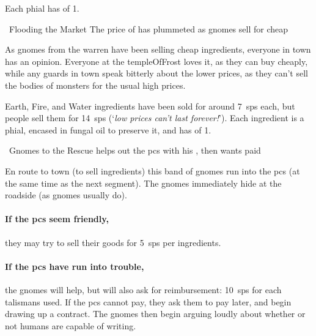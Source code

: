 Each phial has  of 1.

{\squash~Flooding the Market}%
{The price of  has plummeted as gnomes sell for cheap}%

\begin{exampletext}
  As gnomes from the \gls{warren} have been selling cheap \glspl{ingredient}, everyone in town has an opinion.
  Everyone at the \gls{templeOfFrost} loves it, as they can buy cheaply, while any \glspl{guard} in town speak bitterly about the lower prices, as they can't sell the bodies of \glspl{monster} for the usual high prices.
\end{exampletext}

Earth, Fire, and Water \glspl{ingredient} have been sold for around 7~\glspl{sp} each, but people sell them for 14~\glspl{sp} (`\textit{low prices can't last forever!}').
Each \gls{ingredient} is a phial, encased in fungal oil to preserve it, and has  of 1.

{\squash~Gnomes to the Rescue}%
{ helps out the \glspl{pc} with his , then wants paid}%

En route to town (to sell \glspl{ingredient}) this band of gnomes run into the \glspl{pc} (at the same time as the next \gls{segment}).
The gnomes immediately hide at the roadside (as gnomes usually do).

\paragraph{If the \glspl{pc} seem friendly,}
they may try to sell their goods for 5~\glspl{sp} per \glspl{ingredient}.

\paragraph{If the \glspl{pc} have run into trouble,}
the gnomes will help, but will also ask for reimbursement: 10~\glspl{sp} for each \glspl{talisman} used.
If the \glspl{pc} cannot pay, they ask them to pay later, and begin drawing up a contract.
The gnomes then begin arguing loudly about whether or not humans are capable of writing.


